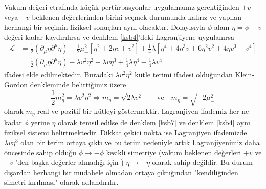 Vakum değeri etrafında küçük pertürbasyonlar uygulamamız gerektiğinden $+v$ veya $-v$ beklenen  değerlerinden birini seçmek durumunda kalırız ve yapılan herhangi bir seçimin fiziksel sonuçları aynı olacaktır. Dolayısıyla $\phi$ alanı $\eta = \phi - v$ değeri kadar kaydırılırsa ve denklem \eqref{ksb4}'deki Lagranjiyene uygulanırsa
\begin{equation} \label{ksb7}
\begin{split}
\mathcal{L} & = \frac{1}{2} (\partial_{\mu}\eta\partial^{\mu}\eta) - \frac{1}{2}\mu_{-}^{2} \left[ \eta^{2} + 2\eta v + v^2 \right] + \frac{1}{4}\lambda \left[ \eta^{4} + 4 \eta^{3} v + 6 \eta^{2} v^{2} + 4 \eta v^{3} + v^{4 } \right] \\
 & = \frac{1}{2} (\partial_{\mu}\eta\partial^{\mu}\eta) - \lambda v^{2} \eta^{2}  + \lambda v \eta^{3} + \frac{1}{4} \lambda \eta^{4} - \frac{1}{4} \lambda v^4
\end{split}
\end{equation}
ifadesi elde edilmektedir. Buradaki $\lambda v^{2} \eta^{2}$ kütle terimi ifadesi olduğundan Klein-Gordon denkleminde belirtiğimiz üzere 
\begin{equation} \label{ksb8}
\frac{1}{2} m_{\eta}^2 = \lambda v^{2} \eta^{2} \Rightarrow m_{\eta} = \sqrt{2 \lambda v^2} \qquad \textrm{ve}\quad m_{\eta} = \sqrt{-2\mu_{-}^2} 
\end{equation}
olarak $m_{\eta}$ real ve pozitif bir kütleyi göstermektir. Lagranjiyen ifademiz her ne kadar $\phi$ yerine $\eta$ olarak temsil edilse de denklem \eqref{ksb7} ve denklem \eqref{ksb4} aynı fiziksel sistemi belirtmektedir. Dikkat çekici nokta ise Lagranjiyen ifademizde $\lambda v \eta^{3}$ olan bir terim ortaya çıktı ve bu terim nedeniyle artık Lagranjiyenimiz daha öncesinde sahip olduğu $\phi \to -\phi$ kesikli simetriye (vakum beklenen değerleri $+v$ ve $-v$ 'den başka değerler almadığı için ) $\eta \to -\eta$ olarak sahip değildir. Bu durum dışardan herhangi bir müdahele olmadan ortaya çıktığından "kendiliğinden simetri kırılması" olarak adlandırılır. 

